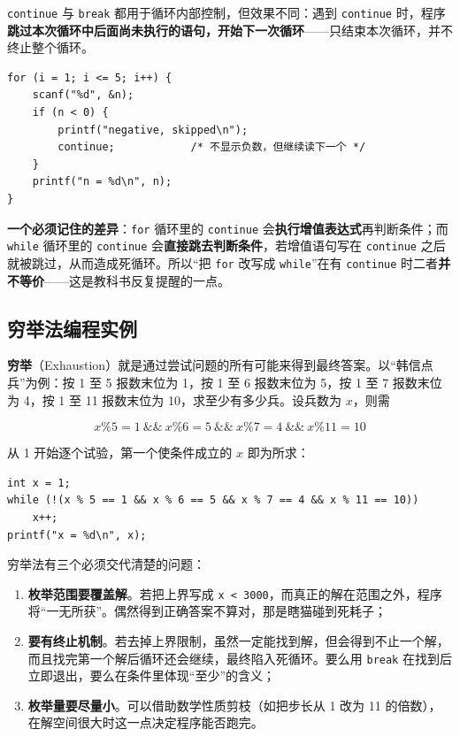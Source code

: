 \texttt{continue} 与 \texttt{break} 都用于循环内部控制，但效果不同：遇到 \texttt{continue} 时，程序\textbf{跳过本次循环中后面尚未执行的语句，开始下一次循环}——只结束本次循环，并不终止整个循环。

\begin{lstlisting}
for (i = 1; i <= 5; i++) {
    scanf("%d", &n);
    if (n < 0) {
        printf("negative, skipped\n");
        continue;            /* 不显示负数，但继续读下一个 */
    }
    printf("n = %d\n", n);
}
\end{lstlisting}

\textbf{一个必须记住的差异}：\texttt{for} 循环里的 \texttt{continue} 会\textbf{执行增值表达式}再判断条件；而\texttt{while} 循环里的 \texttt{continue} 会\textbf{直接跳去判断条件}，若增值语句写在 \texttt{continue} 之后就被跳过，从而造成死循环。所以“把 \texttt{for} 改写成 \texttt{while}”在有 \texttt{continue} 时二者\textbf{并不等价}——这是教科书反复提醒的一点。

\subsection{穷举法编程实例}

\textbf{穷举}（Exhaustion）就是通过尝试问题的所有可能来得到最终答案。以“韩信点兵”为例：按 1 至 5 报数末位为 1，按 1 至 6 报数末位为 5，按 1 至 7 报数末位为 4，按 1 至 11 报数末位为 10，求至少有多少兵。设兵数为 $x$，则需

\[
x\%5=1 \ \&\&\ x\%6=5 \ \&\&\ x\%7=4 \ \&\&\ x\%11=10
\]

从 1 开始逐个试验，第一个使条件成立的 $x$ 即为所求：

\begin{lstlisting}
int x = 1;
while (!(x % 5 == 1 && x % 6 == 5 && x % 7 == 4 && x % 11 == 10))
    x++;
printf("x = %d\n", x);
\end{lstlisting}

穷举法有三个必须交代清楚的问题：

\begin{enumerate}
  \item \textbf{枚举范围要覆盖解}。若把上界写成 \texttt{x < 3000}，而真正的解在范围之外，程序将“一无所获”。偶然得到正确答案不算对，那是瞎猫碰到死耗子；
  \item \textbf{要有终止机制}。若去掉上界限制，虽然一定能找到解，但会得到不止一个解，而且找完第一个解后循环还会继续，最终陷入死循环。要么用 \texttt{break} 在找到后立即退出，要么在条件里体现“至少”的含义；
  \item \textbf{枚举量要尽量小}。可以借助数学性质剪枝（如把步长从 1 改为 11 的倍数），在解空间很大时这一点决定程序能否跑完。
\end{enumerate}

